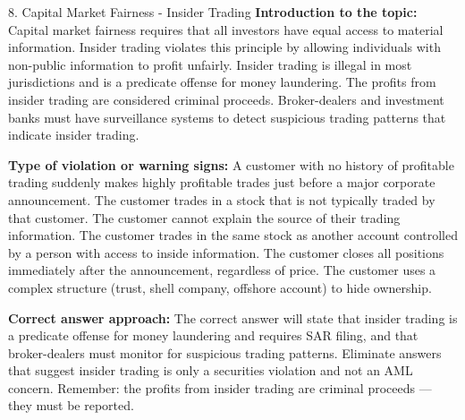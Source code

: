 \documentclass[11pt,a4paper]{beamer}
\begin{document}
\begin{frame}{8. Capital Market Fairness - Insider Trading}
\tiny
\noindent\textbf{Introduction to the topic:} Capital market fairness requires that all investors have equal access to material information. Insider trading violates this principle by allowing individuals with non-public information to profit unfairly. Insider trading is illegal in most jurisdictions and is a predicate offense for money laundering. The profits from insider trading are considered criminal proceeds. Broker-dealers and investment banks must have surveillance systems to detect suspicious trading patterns that indicate insider trading.

\vspace{0.1cm}
\noindent\textbf{Type of violation or warning signs:} A customer with no history of profitable trading suddenly makes highly profitable trades just before a major corporate announcement. The customer trades in a stock that is not typically traded by that customer. The customer cannot explain the source of their trading information. The customer trades in the same stock as another account controlled by a person with access to inside information. The customer closes all positions immediately after the announcement, regardless of price. The customer uses a complex structure (trust, shell company, offshore account) to hide ownership.

\vspace{0.1cm}
\noindent\textbf{Correct answer approach:} The correct answer will state that insider trading is a predicate offense for money laundering and requires SAR filing, and that broker-dealers must monitor for suspicious trading patterns. Eliminate answers that suggest insider trading is only a securities violation and not an AML concern. Remember: the profits from insider trading are criminal proceeds — they must be reported.
\end{frame}
\end{document}
